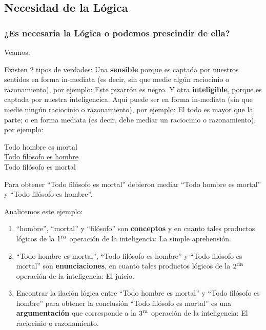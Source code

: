 \documentclass{article}
\begin{document}
\subsection{Necesidad de la Lógica}

\subsubsection{¿Es necesaria la Lógica o podemos prescindir de ella?}
    Veamos: \par
    Existen 2 tipos de verdades: Una \textbf{sensible} porque es captada por nuestros sentidos en forma in-mediata (es decir, sin que medie algún raciocinio o razonamiento), por ejemplo: Este pizarrón es negro. Y otra \textbf{inteligible}, porque es captada por nuestra inteligencica. Aquí puede ser en forma in-mediata (sin que medie ningún raciocinio o razonamiento), por ejemplo: El todo es mayor que la parte; o en forma mediata (es decir, debe mediar un raciocinio o razonamiento), por ejemplo:
    
\begin{center}
    Todo hombre es mortal            \\
    \underline{Todo filósofo es hombre}  \\
    Todo filósofo es mortal
\end{center}

    Para obtener ``Todo filósofo es mortal'' debieron mediar ``Todo hombre es mortal'' y ``Todo filósofo es hombre''. \par 
    Analicemos este ejemplo: 
\begin{enumerate}
    \item ``hombre'', ``mortal'' y ``filósofo'' son \textbf{conceptos} y en cuanto tales productos lógicos de la $1^{\textrm{\footnotesize{ra}}}$ operación de la inteligencia: La simple aprehensión.
    \item ``Todo hombre es mortal'', ``Todo filósofo es hombre'' y ``Todo filósofo es mortal'' son \textbf{enunciaciones}, en cuanto tales productos lógicos de la $2^{\textrm{\footnotesize{da}}}$ operación de la inteligencia: El juicio.
    \item Encontrar la ilación lógica entre ``Todo hombre es mortal'' y ``Todo filósofo es hombre'' para obtener la conclusión ``Todo filósofo es mortal'' es una \textbf{argumentación} que corresponde a la $3^{\textrm{\footnotesize{ra}}}$ operación de la inteligencia: El raciocinio o razonamiento. \\
\end{enumerate}
\end{document}
